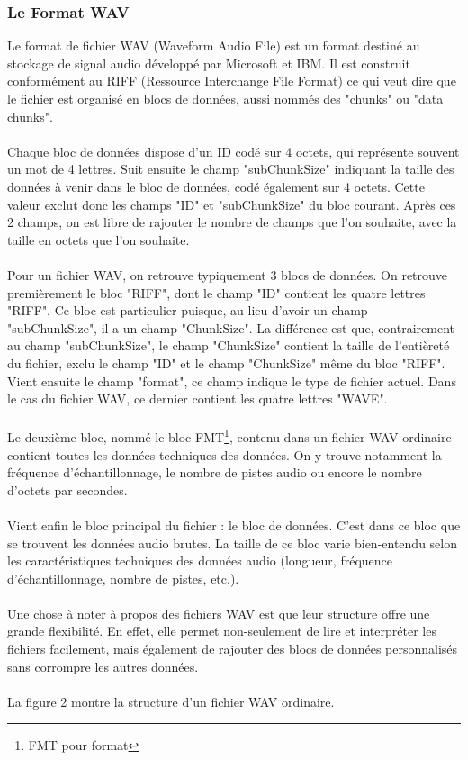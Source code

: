\documentclass[11pt]{article}
\begin{document}
\subsubsection{Le Format WAV}

Le format de fichier WAV (Waveform Audio File) est un format destiné au stockage de signal audio développé par Microsoft et IBM.
Il est construit conformément au RIFF (Ressource Interchange File Format) ce qui veut dire que le fichier est organisé en blocs de données, aussi nommés des "chunks" ou "data chunks".\\
\\
Chaque bloc de données dispose d'un ID codé sur 4 octets, qui représente souvent un mot de 4 lettres.
Suit ensuite le champ "subChunkSize" indiquant la taille des données à venir dans le bloc de données, codé également sur 4 octets.
Cette valeur exclut donc les champs "ID" et "subChunkSize" du bloc courant.
Après ces 2 champs, on est libre de rajouter le nombre de champs que l'on souhaite, avec la taille en octets que l'on souhaite.\\
\\
Pour un fichier WAV, on retrouve typiquement 3 blocs de données.
On retrouve premièrement le bloc "RIFF", dont le champ "ID" contient les quatre lettres "RIFF".
Ce bloc est particulier puisque, au lieu d'avoir un champ "subChunkSize", il a un champ "ChunkSize".
La différence est que, contrairement au champ "subChunkSize", le champ "ChunkSize" contient la taille de l'entièreté du fichier, exclu le champ "ID" et le champ "ChunkSize" même du bloc "RIFF".
Vient ensuite le champ "format", ce champ indique le type de fichier actuel.
Dans le cas du fichier WAV, ce dernier contient les quatre lettres "WAVE".\\
\\
Le deuxième bloc, nommé le bloc FMT\footnote{FMT pour format}, contenu dans un fichier WAV ordinaire contient toutes les données techniques des données.
On y trouve notamment la fréquence d'échantillonnage, le nombre de pistes audio ou encore le nombre d'octets par secondes.\\
\\
Vient enfin le bloc principal du fichier : le bloc de données.
C'est dans ce bloc que se trouvent les données audio brutes.
La taille de ce bloc varie bien-entendu selon les caractéristiques techniques des données audio (longueur, fréquence d'échantillonnage, nombre de pistes, etc.).\\
\\
Une chose à noter à propos des fichiers WAV est que leur structure offre une grande flexibilité.
En effet, elle permet non-seulement de lire et interpréter les fichiers facilement, mais également de rajouter des blocs de données personnalisés sans corrompre les autres données.\\
\\
La figure 2 montre la structure d'un fichier WAV ordinaire.
\end{document}
